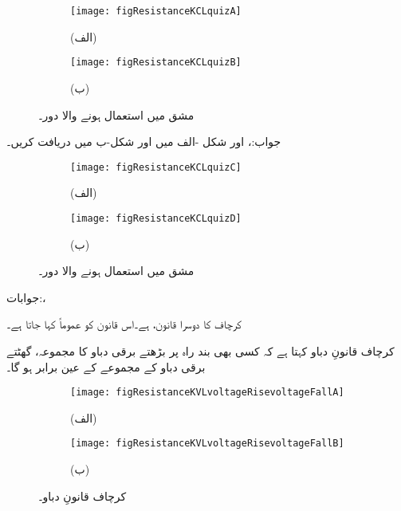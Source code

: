 \begin{figure}
\centering
\begin{subfigure}{0.5\textwidth}
\centering
\texttt{[image: figResistanceKCLquizA]}
\caption*{(الف)}
\end{subfigure}%
%
\begin{subfigure}{0.5\textwidth}
\centering
\texttt{[image: figResistanceKCLquizB]}
\caption*{(ب)}
\end{subfigure}%
\caption{مشق  میں استعمال ہونے والا دور۔}
\label{شکل_مزاحمتی_مشق_الف}
\end{figure}
جواب:،  اور 
\FloatBarrier
شکل -الف میں  اور شکل-ب میں  دریافت کریں۔
\begin{figure}[!h]
\centering
\begin{subfigure}{0.5\textwidth}
\centering
\texttt{[image: figResistanceKCLquizC]}
\caption*{(الف)}
\end{subfigure}%
%
\begin{subfigure}{0.5\textwidth}
\centering
\texttt{[image: figResistanceKCLquizD]}
\caption*{(ب)}
\end{subfigure}%
\caption{مشق  میں استعمال ہونے والا دور۔}
\label{شکل_مزاحمتی_مشق_ب}
\end{figure}

جوابات:، 
\FloatBarrier

کرچاف کا دوسرا قانون،   ہے۔اس قانون کو عموماً  کہا جاتا ہے۔

کرچاف قانونِ دباو کہتا ہے کہ کسی بھی بند راہ پر بڑھتے برقی دباو کا مجموعہ، گھٹتے برقی دباو کے مجموعے کے عین برابر ہو گا۔

\begin{figure}
\centering
\begin{subfigure}{0.5\textwidth}
\centering
\texttt{[image: figResistanceKVLvoltageRisevoltageFallA]}
\caption*{(الف)}
\end{subfigure}%
%
\begin{subfigure}{0.5\textwidth}
\centering
\texttt{[image: figResistanceKVLvoltageRisevoltageFallB]}
\caption*{(ب)}
\end{subfigure}%
\caption{کرچاف قانونِ دباو۔}
\label{شکل_مزاحمتی_قانون_دباو}
\end{figure}

